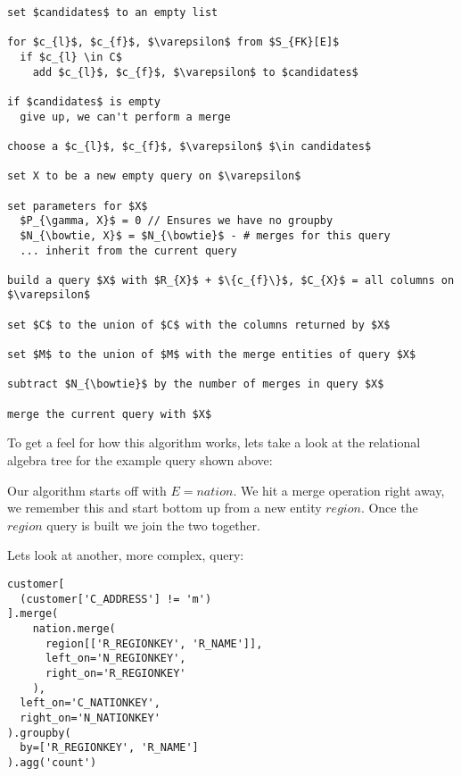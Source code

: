 \documentclass[10pt, twocolumn]{article}
\begin{document}
\spacing
\begin{lstlisting}
set $candidates$ to an empty list

for $c_{l}$, $c_{f}$, $\varepsilon$ from $S_{FK}[E]$
  if $c_{l} \in C$
    add $c_{l}$, $c_{f}$, $\varepsilon$ to $candidates$

if $candidates$ is empty
  give up, we can't perform a merge

choose a $c_{l}$, $c_{f}$, $\varepsilon$ $\in candidates$

set X to be a new empty query on $\varepsilon$

set parameters for $X$
  $P_{\gamma, X}$ = 0 // Ensures we have no groupby
  $N_{\bowtie, X}$ = $N_{\bowtie}$ - # merges for this query
  ... inherit from the current query

build a query $X$ with $R_{X}$ + $\{c_{f}\}$, $C_{X}$ = all columns on $\varepsilon$

set $C$ to the union of $C$ with the columns returned by $X$

set $M$ to the union of $M$ with the merge entities of query $X$

subtract $N_{\bowtie}$ by the number of merges in query $X$

merge the current query with $X$
\end{lstlisting}

\spacing
\noindent
To get a feel for how this algorithm works, lets take a look at the relational algebra tree for the example query shown above:

\spacing
{}

\spacing
\noindent
Our algorithm starts off with $E = nation$. We hit a merge operation right away, we remember this and start bottom up from a new entity $region$. Once the $region$ query is built we join the two together.

\spacing
\noindent
Lets look at another, more complex, query:

\begin{verbatim}
customer[
  (customer['C_ADDRESS'] != 'm')
].merge(
    nation.merge(
      region[['R_REGIONKEY', 'R_NAME']],
      left_on='N_REGIONKEY',
      right_on='R_REGIONKEY'
    ),
  left_on='C_NATIONKEY',
  right_on='N_NATIONKEY'
).groupby(
  by=['R_REGIONKEY', 'R_NAME']
).agg('count')
\end{verbatim}
\end{document}
